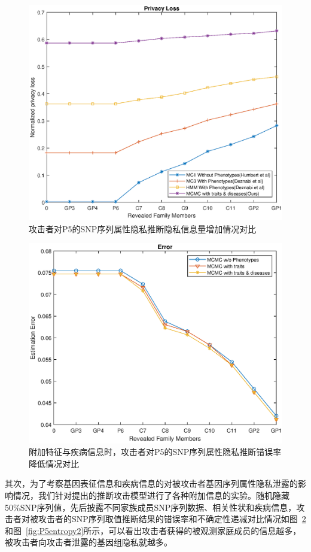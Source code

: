 \begin{figure}[htbp]
	\centering
	\includegraphics[width=0.8\linewidth]{./figures/P5privacyloss1.eps}
	\centering
	\caption{攻击者对P5的SNP序列属性隐私推断隐私信息量增加情况对比}\label{fig:P5privacyloss1}
\end{figure}


\begin{figure}[htbp]
	\centering
	\includegraphics[width=0.8\linewidth]{./figures/P5error2.eps}
	\centering
	\caption{附加特征与疾病信息时，攻击者对P5的SNP序列属性隐私推断错误率降低情况对比}\label{fig:P5error2}
\end{figure}


其次，为了考察基因表征信息和疾病信息的对被攻击者基因序列属性隐私泄露的影响情况，我们针对提出的推断攻击模型进行了各种附加信息的实验。随机隐藏50\%SNP序列值，先后披露不同家族成员SNP序列数据、相关性状和疾病信息，攻击者对被攻击者的SNP序列取值推断结果的错误率和不确定性递减对比情况如图~\ref{fig:P5error2}和图~\ref{fig:P5entropy2}所示，可以看出攻击者获得的被观测家庭成员的信息越多，被攻击者向攻击者泄露的基因组隐私就越多。

